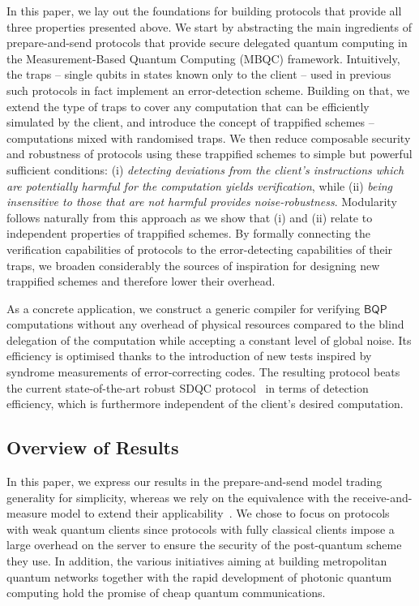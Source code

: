 \documentclass[12pt]{iopart}
\renewcommand{\1}{\mathds{1}}
\begin{document}
In this paper, we lay out the foundations for building protocols that provide all three properties presented above. We start by abstracting the main ingredients of prepare-and-send protocols that provide secure delegated quantum computing in the Measurement-Based Quantum Computing (MBQC) framework. Intuitively, the traps -- single qubits in states known only to the client -- used in previous such protocols in fact implement an error-detection scheme. Building on that, we extend the type of traps to cover any computation that can be efficiently simulated by the client, and introduce the concept of trappified schemes -- computations mixed with randomised traps. We then reduce composable security and robustness of protocols using these trappified schemes to simple but powerful sufficient conditions: (i) \emph{detecting deviations from the client's instructions which are potentially harmful for the computation yields verification}, while (ii) \emph{being insensitive to those that are not harmful provides noise-robustness}. Modularity follows naturally from this approach as we show that (i) and (ii) relate to independent properties of trappified schemes. By formally connecting the verification capabilities of protocols to the error-detecting capabilities of their traps, we broaden considerably the sources of inspiration for designing new trappified schemes and therefore lower their overhead.

As a concrete application, we construct a generic compiler for verifying $\mathsf{BQP}$ computations without any overhead of physical resources compared to the blind delegation of the computation while accepting a constant level of global noise. Its efficiency is optimised thanks to the introduction of new tests inspired by syndrome measurements of error-correcting codes. The resulting protocol beats the current state-of-the-art robust SDQC protocol~\cite{LMKO21:verifying} in terms of detection efficiency, which is furthermore independent of the client's desired computation.









\subsection{Overview of Results}
\label{subsec:sum}

In this paper, we express our results in the prepare-and-send model trading generality for simplicity, whereas we rely on the equivalence with the receive-and-measure model to extend their applicability~\cite{WEP22:equivalence}. We chose to focus on protocols with weak quantum clients since protocols with fully classical clients impose a large overhead on the server to ensure the security of the post-quantum scheme they use. In addition, the various initiatives aiming at building metropolitan quantum networks together with the rapid development of photonic quantum computing hold the promise of cheap quantum communications.
\end{document}
